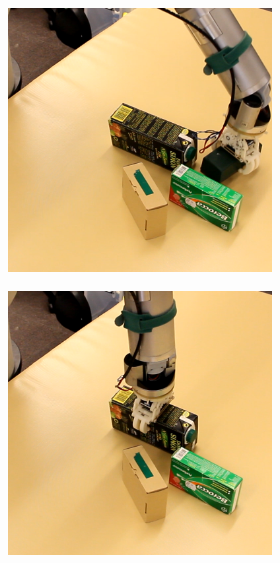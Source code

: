 \begin{figure}
\begin{subfigure}[t]{\textwidth}
\begin{subfigure}[t]{0.195\textwidth}
\end{subfigure}
\end{subfigure}
\vspace{1cm}
\begin{center}
\begin{subfigure}[t]{\textwidth}
\centering
\begin{subfigure}[t]{0.195\textwidth}
\centering 
\includegraphics[width=\textwidth]{Img/experiments/exp_good/action6c.png}
\end{subfigure}
\begin{subfigure}[t]{0.195\textwidth}
\centering 
\includegraphics[width=\textwidth]{Img/experiments/exp_good/action7c.png}

\end{subfigure}
\end{subfigure}
\end{center}
\end{figure}
